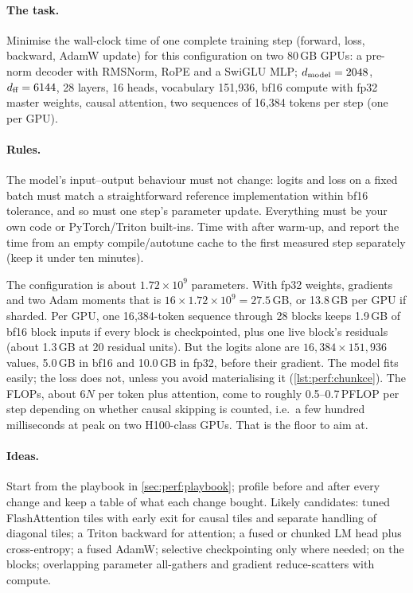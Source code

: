 \paragraph{The task.} Minimise the wall-clock time of one complete training step (forward, loss,
backward, AdamW update) for this configuration on two 80\,GB GPUs:
a pre-norm decoder with RMSNorm, RoPE and a SwiGLU MLP; $d_{\text{model}}=2048$, $d_{\text{ff}}=6144$, 28 layers,
16 heads, vocabulary 151{,}936, bf16 compute with fp32 master weights, causal attention, two
sequences of 16{,}384 tokens per step (one per GPU).

\paragraph{Rules.} The model's input--output behaviour must not change: logits and loss on a fixed
batch must match a straightforward reference implementation within bf16 tolerance, and so must one
step's parameter update. Everything must be your own code or PyTorch/Triton built-ins. Time with
 after warm-up, and report the time from an empty compile/autotune
cache to the first measured step separately (keep it under ten minutes).

\begin{napkinmath}
The configuration is about $1.72\times10^9$ parameters. With fp32 weights, gradients and two Adam
moments that is $16\times1.72\times10^9=27.5$\,GB, or 13.8\,GB per GPU if sharded. Per GPU, one
16{,}384-token sequence through 28 blocks keeps 1.9\,GB of bf16 block inputs if every block is
checkpointed, plus one live block's residuals (about 1.3\,GB at 20 residual units). But the logits
alone are $16{,}384\times151{,}936$ values, 5.0\,GB in bf16 and 10.0\,GB in fp32, before their gradient.
The model fits easily; the loss does not, unless you avoid materialising it (\cref{lst:perf:chunkce}).
The FLOPs, about $6N$ per token plus attention, come to roughly 0.5--0.7\,PFLOP per step depending on
whether causal skipping is counted, i.e.\ a few hundred milliseconds at peak on two H100-class GPUs.
That is the floor to aim at.
\end{napkinmath}

\paragraph{Ideas.} Start from the playbook in \cref{sec:perf:playbook}; profile before and after
every change and keep a table of what each change bought. Likely candidates: tuned FlashAttention
tiles with early exit for causal tiles and separate handling of diagonal tiles; a Triton backward for
attention; a fused or chunked LM head plus cross-entropy; a fused AdamW; selective checkpointing
only where needed;  on the blocks; overlapping parameter all-gathers and
gradient reduce-scatters with compute.

